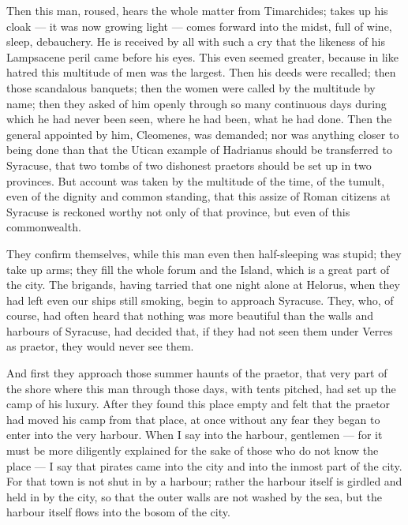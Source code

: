  Then this man, roused, hears the whole matter from Timarchides; takes up his cloak --- it was now growing light --- comes forward into the midst, full of wine, sleep, debauchery. He is received by all with such a cry that the likeness of his Lampsacene peril came before his eyes. This even seemed greater, because in like hatred this multitude of men was the largest. Then his deeds were recalled; then those scandalous banquets; then the women were called by the multitude by name; then they asked of him openly through so many continuous days during which he had never been seen, where he had been, what he had done. Then the general appointed by him, Cleomenes, was demanded; nor was anything closer to being done than that the Utican example of Hadrianus should be transferred to Syracuse, that two tombs of two dishonest praetors should be set up in two provinces. But account was taken by the multitude of the time, of the tumult, even of the dignity and common standing, that this assize of Roman citizens at Syracuse is reckoned worthy not only of that province, but even of this commonwealth.

 They confirm themselves, while this man even then half-sleeping was stupid; they take up arms; they fill the whole forum and the Island, which is a great part of the city. The brigands, having tarried that one night alone at Helorus, when they had left even our ships still smoking, begin to approach Syracuse. They, who, of course, had often heard that nothing was more beautiful than the walls and harbours of Syracuse, had decided that, if they had not seen them under Verres as praetor, they would never see them.

 And first they approach those summer haunts of the praetor, that very part of the shore where this man through those days, with tents pitched, had set up the camp of his luxury. After they found this place empty and felt that the praetor had moved his camp from that place, at once without any fear they began to enter into the very harbour. When I say into the harbour, gentlemen --- for it must be more diligently explained for the sake of those who do not know the place --- I say that pirates came into the city and into the inmost part of the city. For that town is not shut in by a harbour; rather the harbour itself is girdled and held in by the city, so that the outer walls are not washed by the sea, but the harbour itself flows into the bosom of the city.

